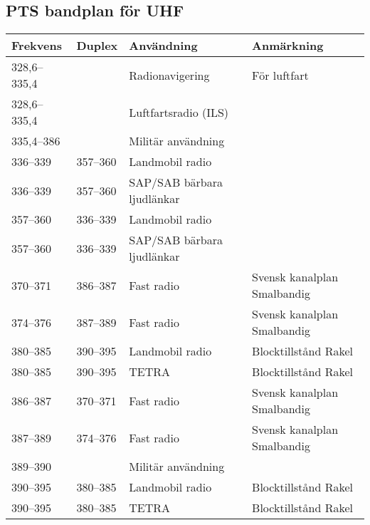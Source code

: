 \documentclass[10pt,swedish,a4paper,twoside]{article}
\begin{document}
\begin{landscape}
\section{PTS bandplan för UHF}
\begin{longtable}{llll}
	\textbf{Frekvens}  & \textbf{Duplex}    & \textbf{Användning}            & \textbf{Anmärkning}                 \\ \hline
	328,6--335,4       &                    & Radionavigering                & För luftfart                        \\
	328,6--335,4       &                    & Luftfartsradio (ILS)           &  \\
	335,4--386         &                    & Militär användning             &  \\
	336--339           & 357--360           & Landmobil radio                &  \\
	336--339           & 357--360           & SAP/SAB bärbara ljudlänkar     &  \\
	357--360           & 336--339           & Landmobil radio                &  \\
	357--360           & 336--339           & SAP/SAB bärbara ljudlänkar     &  \\
	370--371           & 386--387           & Fast radio                     & Svensk kanalplan Smalbandig         \\
	374--376           & 387--389           & Fast radio                     & Svensk kanalplan Smalbandig         \\
	380--385           & 390--395           & Landmobil radio                & Blocktillstånd Rakel                \\
	380--385           & 390--395           & TETRA                          & Blocktillstånd Rakel                \\
	386--387           & 370--371           & Fast radio                     & Svensk kanalplan Smalbandig         \\
	387--389           & 374--376           & Fast radio                     & Svensk kanalplan Smalbandig         \\
	389--390           &                    & Militär användning             &  \\
	390--395           & 380--385           & Landmobil radio                & Blocktillstånd Rakel                \\
	390--395           & 380--385           & TETRA                          & Blocktillstånd Rakel                \\

\end{longtable}
\end{landscape}
\end{document}
